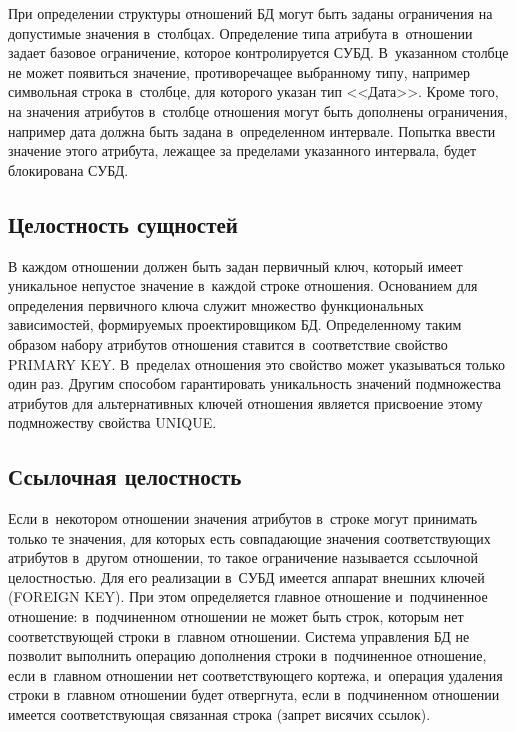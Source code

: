 \begin{multicols}{2}
  При определении структуры отношений БД могут быть заданы ограничения
на допустимые зна\-чения в~столбцах. Определение типа атрибута в~отноше\-нии
задает базовое ограничение, которое контролируется СУБД. В~указанном
столбце не может появиться значение, противоречащее выбранному типу,
например символьная строка в~столбце, для которого указан тип <<Дата>>.
Кроме того, на значения атрибутов в~столбце отношения могут быть дополнены
ограничения, например дата должна быть задана в~определенном интервале.
Попытка ввес\-ти значение этого атрибута, лежащее за пределами указанного
интервала, будет блокирована СУБД.

\subsection{Целостность сущностей}

  В каждом отношении должен быть задан первичный ключ, который имеет
уникальное непустое значение в~каждой строке отношения. Основанием для
определения первичного ключа служит множество функциональных
зависимостей, формиру\-емых проектировщиком БД. Определенному таким
образом набору атрибутов отношения ставится в~соответствие свойство
PRIMARY KEY. В~пределах отношения это свойство может указываться
только один раз. Другим способом гарантировать уникальность значений
подмножества атрибутов для альтернативных ключей отношения является
присвоение этому подмножеству свойства UNIQUE.

\subsection{Ссылочная целостность}

  Если в~некотором отношении значения атрибутов в~строке могут принимать
только те значения, для которых есть совпадающие значения соответствующих
атрибутов в~другом отношении, то такое ограничение называется ссылочной
це\-лост\-ностью. Для его реализации в~СУБД имеется аппарат внешних ключей
(FOREIGN KEY). При этом определяется главное отношение и~подчиненное
отношение: в~подчиненном отношении не может быть строк, которым нет
соответствующей строки в~главном отношении. Система управ\-ле\-ния БД не позволит выполнить
операцию дополнения строки в~подчиненное отношение, если в~главном
отношении нет соответствующего кортежа, и~операция удаления строки в~главном отношении будет отвергнута, если в~подчиненном отношении имеется
соответствующая связанная строка (запрет висячих ссылок).


\end{multicols}
